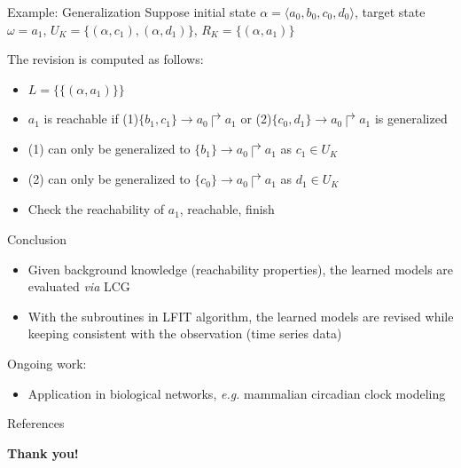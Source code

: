 \documentclass[8pt]{beamer}
\begin{document}
\begin{frame}{Example: Generalization}
    Suppose initial state $\alpha=\langle a_0,b_0,c_0,d_0\rangle$, target state $\omega=a_1$, $U_K=\{(\alpha,c_1),(\alpha,d_1)\}$, $R_K=\{(\alpha,a_1)\}$
    \begin{figure}
        \centering
        
    \end{figure}
    The revision is computed as follows: 
    \begin{itemize}
        \item $L=\{\{(\alpha,a_1)\}\}$
        \item $a_1$ is reachable if (1)$\{b_1,c_1\}\to a_0\Rsh a_1$ or (2)$\{c_0,d_1\}\to a_0\Rsh a_1$ is generalized
        \item (1) can only be generalized to $\{b_1\}\to a_0\Rsh a_1$ as $c_1\in U_K$
        \item (2) can only be generalized to $\{c_0\}\to a_0\Rsh a_1$ as $d_1\in U_K$
        \item Check the reachability of $a_1$, reachable, finish
    \end{itemize}
    
\end{frame}

\begin{frame}{Conclusion}
    \begin{itemize}
        \item Given background knowledge (reachability properties), the learned models are evaluated  \textit{via} LCG
        \item With the subroutines in LFIT algorithm, the learned models are revised while keeping consistent with the observation (time series data)
    \end{itemize}
    
    Ongoing work:
    \begin{itemize}
        \item Application in biological networks, \textit{e.g.} mammalian circadian clock modeling
    \end{itemize}
\end{frame}

\begin{frame}{References}


\end{frame}

\begin{frame}
\Large
\centering

{\bf Thank you!}
    
\end{frame}
\end{document}
